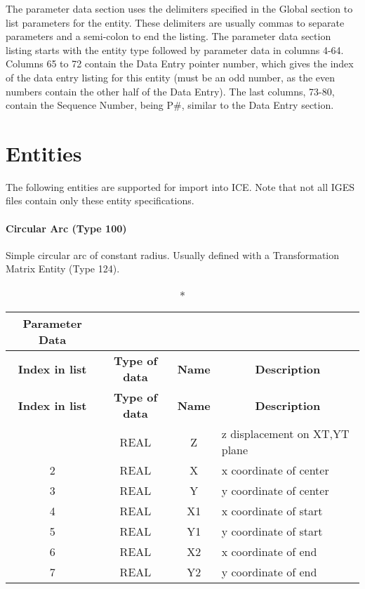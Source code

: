 The parameter data section uses the delimiters specified in the Global
section to list parameters for the entity. These delimiters are usually
commas to separate parameters and a semi-colon to end the listing. The
parameter data section listing starts with the entity type followed by
parameter data in columns 4-64. Columns 65 to 72 contain the Data Entry
pointer number, which gives the index of the data entry listing for this
entity (must be an odd number, as the even numbers contain the other
half of the Data Entry). The last columns, 73-80, contain the Sequence
Number, being P\#, similar to the Data Entry section.

\section*{Entities}\label{entities}

The following entities are supported for import into ICE. Note that not
all IGES files contain only these entity specifications.

\paragraph{Circular Arc (Type 100)}\label{circular-arc-type-100}

Simple circular arc of constant radius. Usually defined with a
Transformation Matrix Entity (Type 124).

\begin{longtable}[H]{|c|c|c|l|}
  \caption*{Parameter Data} \\

  \hline
  \multicolumn{1}{|c|}{\textbf{Index in list}} & \multicolumn{1}{|c|}{\textbf{Type of data}} &
  \multicolumn{1}{|c|}{\textbf{Name}} & \multicolumn{1}{|c|}{\textbf{Description}} \\ \hline
  \endfirsthead
  \hline
  \multicolumn{1}{|c|}{\textbf{Index in list}} & \multicolumn{1}{|c|}{\textbf{Type of data}} &
  \multicolumn{1}{|c|}{\textbf{Name}} & \multicolumn{1}{|c|}{\textbf{Description}} \\ \hline
  \endhead
  
  \endfoot

  \endlastfoot
1 & REAL & Z & z displacement on XT,YT plane \\ \hline
2 & REAL & X & x coordinate of center \\ \hline
3 & REAL & Y & y coordinate of center\\ \hline
4 & REAL & X1 & x coordinate of start\\ \hline
5 & REAL & Y1 & y coordinate of start\\ \hline
6 & REAL & X2 & x coordinate of end\\ \hline
7 & REAL & Y2 & y coordinate of end\\ \hline
\end{longtable}

